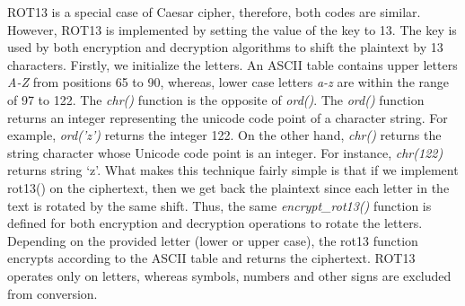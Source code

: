 ROT13 is a special case of Caesar cipher, therefore, both codes are similar. However, ROT13 is implemented by setting the value of the key to 13. The key is used by both encryption and decryption algorithms to shift the plaintext by 13 characters. Firstly, we initialize the letters. An ASCII table contains upper letters \textit{A-Z} from positions 65 to 90, whereas, lower case letters \textit{a-z} are within the range of 97 to 122. The \textit{chr()} function is the opposite of \textit{ord()}. The \textit{ord()} function returns an integer representing the unicode code point of a character string. For example, \textit{ord('z')} returns the integer 122. On the other hand, \textit{chr()} returns the string character whose Unicode code point is an integer. For instance, \textit{chr(122)} returns string ‘z’. What makes this technique fairly simple is that if we implement rot13() on the ciphertext, then we get back the plaintext since each letter in the text is rotated by the same shift. Thus, the same \textit{encrypt\_rot13()} function is defined for both encryption and decryption operations to rotate the letters. Depending on the provided letter (lower or upper case), the rot13 function encrypts according to the ASCII table and returns the ciphertext. ROT13 operates only on letters, whereas symbols, numbers and other signs are excluded from conversion. 

